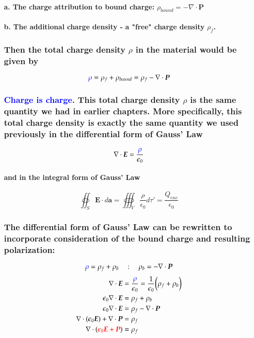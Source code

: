 \documentclass{article}
\begin{document}
\paragraph{\indent a. The charge attribution to bound charge: $\rho_{bound}=-\nabla \cdot \boldsymbol{P}$}
\paragraph{\indent b. The additional charge density - a "free" charge density $\rho_f$.}
\subsubsection{Then the total charge density $\rho$ in the material would be given by}
\begin{equation*}
    \textcolor{blue}{\rho}=\rho_f +\rho_{bound}=\rho_f-\nabla\cdot\boldsymbol{P}
\end{equation*}
\subsubsection{\textcolor{blue}{Charge is charge}. This total charge density $\rho$ is the same quantity we had in earlier chapters. More specifically, this total charge density is exactly the same quantity we used previously in the differential form of Gauss' Law}
\begin{equation*}
    \nabla\cdot\boldsymbol{E}=\frac{\textcolor{blue}{\rho}}{\epsilon_0}
\end{equation*}
\paragraph{and in the integral form of Gauss' Law}
\begin{equation*}
    \oiint_S\boldsymbol{E}\cdot d\boldsymbol{a}=\oiiint_V \frac{\rho}{\epsilon_0}d\tau'=\frac{Q_{enc}}{\epsilon_0}
\end{equation*}
\subsubsection{The differential form of Gauss' Law can be rewritten to incorporate consideration of the bound charge and resulting polarization:}
\begin{equation*}
    \textcolor{blue}{\rho}=\rho_f+\rho_{b}\quad:\quad \rho_b=-\nabla\cdot \boldsymbol{P}
\end{equation*}
\begin{align*}
    \nabla\cdot\boldsymbol{E}&=\frac{\textcolor{blue}{\rho}}{\epsilon_0}=\frac{1}{\epsilon_0}\bigg( \rho_f+\rho_b\bigg)\\
    \epsilon_0\nabla\cdot\boldsymbol{E}&=\rho_f+\rho_b\\
    \epsilon_0\nabla\cdot\boldsymbol{E}&=\rho_f-\nabla\cdot\boldsymbol{P}\\
    \nabla\cdot(\epsilon_0\boldsymbol{E})+\nabla\cdot\boldsymbol{P}&=\rho_f\\
    \nabla\cdot (\textcolor{red}{\epsilon_0\boldsymbol{E}+\boldsymbol{P}})&=\rho_f\\
\end{align*}
\end{document}
